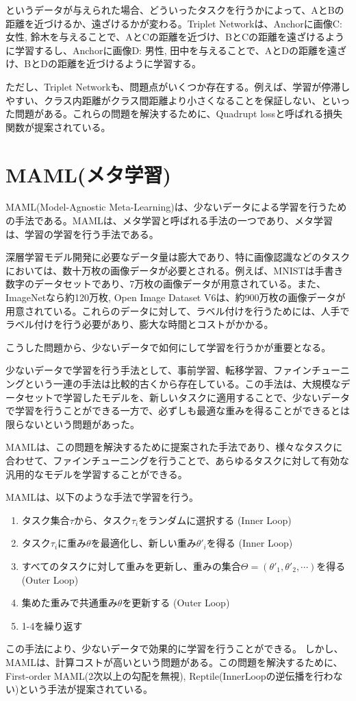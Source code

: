 \documentclass{ltjsarticle}
\begin{document}
というデータが与えられた場合、どういったタスクを行うかによって、AとBの距離を近づけるか、遠ざけるかが変わる。Triplet Networkは、Anchorに画像C: 女性, 鈴木を与えることで、AとCの距離を近づけ、BとCの距離を遠ざけるように学習するし、Anchorに画像D: 男性, 田中を与えることで、AとDの距離を遠ざけ、BとDの距離を近づけるように学習する。
\par
ただし、Triplet Networkも、問題点がいくつか存在する。例えば、学習が停滞しやすい、クラス内距離がクラス間距離より小さくなることを保証しない、といった問題がある。これらの問題を解決するために、Quadrupt lossと呼ばれる損失関数が提案されている。

\section{MAML(メタ学習)}
MAML(Model-Agnostic Meta-Learning)は、少ないデータによる学習を行うための手法である。MAMLは、メタ学習と呼ばれる手法の一つであり、メタ学習は、学習の学習を行う手法である。
\par
深層学習モデル開発に必要なデータ量は膨大であり、特に画像認識などのタスクにおいては、数十万枚の画像データが必要とされる。例えば、MNISTは手書き数字のデータセットであり、7万枚の画像データが用意されている。また、ImageNetなら約120万枚, Open Image Dataset V6は、約900万枚の画像データが用意されている。これらのデータに対して、ラベル付けを行うためには、人手でラベル付けを行う必要があり、膨大な時間とコストがかかる。
\par
こうした問題から、少ないデータで如何にして学習を行うかが重要となる。
\par
少ないデータで学習を行う手法として、事前学習、転移学習、ファインチューニングという一連の手法は比較的古くから存在している。この手法は、大規模なデータセットで学習したモデルを、新しいタスクに適用することで、少ないデータで学習を行うことができる一方で、必ずしも最適な重みを得ることができるとは限らないという問題があった。
\par
MAMLは、この問題を解決するために提案された手法であり、様々なタスクに合わせて、ファインチューニングを行うことで、あらゆるタスクに対して有効な汎用的なモデルを学習することができる。
\par
MAMLは、以下のような手法で学習を行う。
\begin{enumerate}
  \item タスク集合$\tau$から、タスク$\tau_i$をランダムに選択する (Inner Loop)
  \item タスク$\tau_i$に重み$\theta$を最適化し、新しい重み$\theta'_i$を得る (Inner Loop)
  \item すべてのタスクに対して重みを更新し、重みの集合$\Theta=(\theta'_1, \theta'_2, \cdots)$を得る (Outer Loop)
  \item 集めた重みで共通重み$\theta$を更新する (Outer Loop)
  \item 1-4を繰り返す
\end{enumerate}
この手法により、少ないデータで効果的に学習を行うことができる。
しかし、MAMLは、計算コストが高いという問題がある。この問題を解決するために、First-order MAML(2次以上の勾配を無視), Reptile(InnerLoopの逆伝播を行わない)という手法が提案されている。
\end{document}

